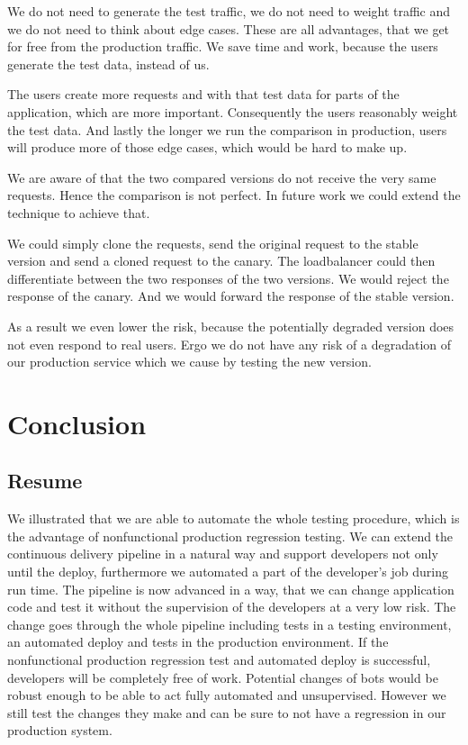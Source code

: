 We do not need to generate the test traffic, we do not need to weight traffic and we do
not need to think about edge cases. These are all advantages, that we get for free from
the production traffic. We save time and work, because the users generate the test data,
instead of us.

The users create more requests and with that test data for parts of the application, which
are more important. Consequently the users reasonably weight the test data. And lastly the
longer we run the comparison in production, users will produce more of those edge cases,
which would be hard to make up.

We are aware of that the two compared versions do not receive the very same
requests. Hence the comparison is not perfect. In future work we could extend the
technique to achieve that.

We could simply clone the requests, send the original request to the stable version and
send a cloned request to the canary. The loadbalancer could then differentiate between the
two responses of the two versions. We would reject the response of the canary. And we
would forward the response of the stable version.

As a result we even lower the risk, because the potentially degraded version does not even
respond to real users. Ergo we do not have any risk of a degradation of our production
service which we cause by testing the new version.

\chapter{Conclusion}
\section{Resume}

We illustrated that we are able to automate the whole testing procedure, which is the
advantage of nonfunctional production regression testing. We can extend the continuous
delivery pipeline in a natural way and support developers not only until the deploy,
furthermore we automated a part of the developer's job during run time. The pipeline is
now advanced in a way, that we can change application code and test it without the
supervision of the developers at a very low risk. The change goes through the whole
pipeline including tests in a testing environment, an automated deploy and tests in the
production environment. If the nonfunctional production regression test and automated
deploy is successful, developers will be completely free of work. Potential changes of
bots would be robust enough to be able to act fully automated and unsupervised. However we
still test the changes they make and can be sure to not have a regression in our
production system.

